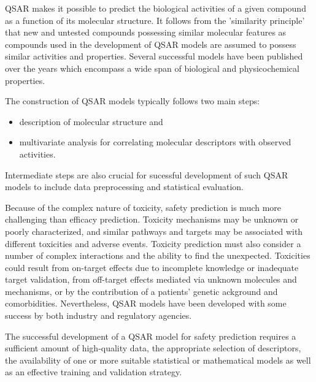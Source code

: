 QSAR makes it possible to predict the biological activities of a given compound as a function of its molecular structure. It follows from the 'similarity principle' that new and untested compounds possessing similar molecular features as compounds used in the development of QSAR models are assumed to possess similar activities and properties. Several successful models have been published over the years which encompass a wide span of biological and physicochemical properties.

The construction of QSAR models typically follows two main steps:
\begin{itemize}
\item description of molecular structure and
\item  multivariate analysis for correlating molecular descriptors with observed activities. 
\end{itemize}
Intermediate steps are also crucial for sucessful development of such QSAR models to include data preprocessing and statistical evaluation. \cite{Nantasenamat2009}

Because of the complex nature of toxicity, safety prediction is much more challenging than efficacy prediction. Toxicity mechanisms may be unknown or poorly characterized, and similar pathways and targets may be associated with different toxicities and adverse events. Toxicity prediction must also consider a number of complex interactions and the ability to find the unexpected. Toxicities could result from on-target effects due to incomplete knowledge or inadequate target validation, from off-target effects mediated via unknown molecules and mechanisms, or by the contribution of a patients’ genetic ackground and comorbidities. Nevertheless, QSAR models have been developed with some success by both industry and regulatory agencies.\cite{Kruhlak2012}

The successful development of a QSAR model for safety prediction requires a sufficient amount of high-quality data, the appropriate selection of descriptors, the availability of one or more suitable statistical or mathematical models as well as an effective training and validation strategy.\cite{Kruhlak2012}


